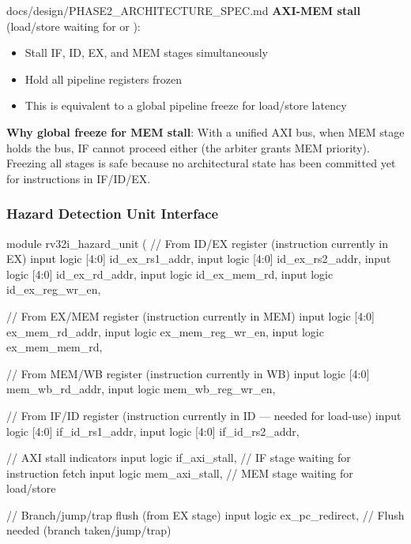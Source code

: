 \begin{relocated}{docs/design/PHASE2_ARCHITECTURE_SPEC.md}
\textbf{AXI-MEM stall} (load/\allowbreak{}store waiting for
 or ):

\begin{itemize}
\tightlist
\item
  Stall IF, ID, EX, and MEM stages simultaneously
\item
  Hold all pipeline registers frozen
\item
  This is equivalent to a global pipeline freeze for
  load/\allowbreak{}store latency
\end{itemize}

\textbf{Why global freeze for MEM stall}: With a unified AXI bus, when
MEM stage holds the bus, IF cannot proceed either (the arbiter grants
MEM priority). Freezing all stages is safe because no architectural
state has been committed yet for instructions in IF/ID/EX.

\subsubsection{Hazard Detection Unit Interface}\label{ds:ch:phase2-architecture:35-hazard-detection-unit-interface}

\begin{textblock}
module rv32i_hazard_unit (
    // From ID/EX register (instruction currently in EX)
    input  logic [4:0]  id_ex_rs1_addr,
    input  logic [4:0]  id_ex_rs2_addr,
    input  logic [4:0]  id_ex_rd_addr,
    input  logic        id_ex_mem_rd,
    input  logic        id_ex_reg_wr_en,

    // From EX/MEM register (instruction currently in MEM)
    input  logic [4:0]  ex_mem_rd_addr,
    input  logic        ex_mem_reg_wr_en,
    input  logic        ex_mem_mem_rd,

    // From MEM/WB register (instruction currently in WB)
    input  logic [4:0]  mem_wb_rd_addr,
    input  logic        mem_wb_reg_wr_en,

    // From IF/ID register (instruction currently in ID — needed for load-use)
    input  logic [4:0]  if_id_rs1_addr,
    input  logic [4:0]  if_id_rs2_addr,

    // AXI stall indicators
    input  logic        if_axi_stall,     // IF stage waiting for instruction fetch
    input  logic        mem_axi_stall,    // MEM stage waiting for load/store

    // Branch/jump/trap flush (from EX stage)
    input  logic        ex_pc_redirect,   // Flush needed (branch taken/jump/trap)


\end{textblock}
\end{relocated}
